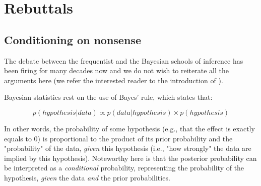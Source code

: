 \documentclass[a4paper,man,natbib,floatsintext,donotrepeattitle]{apa6}
\begin{document}
\section{Rebuttals}





\subsection{Conditioning on nonsense}

The debate between the frequentist and the Bayesian schools of inference has been firing for many decades now and we do not wish to reiterate all the arguments here (we refer the interested reader to the introduction of \citealp{albers_credible_2018}).

Bayesian statistics rest on the use of Bayes' rule, which states that:

$$ p(hypothesis|data) \propto p(data|hypothesis) \times p(hypothesis) $$

In other words, the probability of some hypothesis (e.g., that the effect is exactly equals to 0) is proportional to the product of its prior probability and the "probability" of the data, \textit{given} this hypothesis (i.e., "how strongly" the data are implied by this hypothesis). Noteworthy here is that the posterior probability can be interpreted as a \textit{conditional} probability, representing the probability of the hypothesis, \textit{given} the data \textit{and} the prior probabilities.
\end{document}
